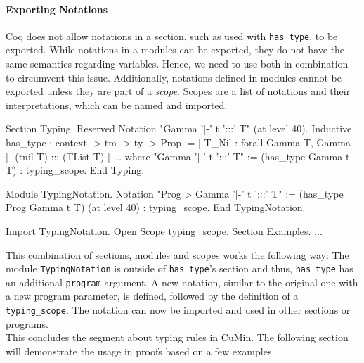 \documentclass[paper = a4, fleqn, abstract=on, twoside]{scrreprt}
\newcommand{\coqinline}[1]{\texttt{#1}}
\begin{document}
\paragraph{Exporting Notations}
Coq does not allow notations in a section, such as used with \coqinline{has_type}, to be exported. While notations in a modules can be exported, they do not have the same semantics regarding variables. Hence, we need to use both in combination to circumvent this issue. Additionally, notations defined in modules cannot be exported unless they are part of a \textit{scope}. Scopes are a list of notations and their interpretations, which can be named and imported.
\begin{coqcode}
Section Typing.
  Reserved Notation "Gamma '|-' t ':::' T" (at level 40).
  Inductive has_type : context -> tm -> ty -> Prop :=
    | T_Nil : forall Gamma T, Gamma |- (tnil T) ::: (TList T)
    | ...
  where "Gamma '|-' t ':::' T" := (has_type Gamma t T) : typing_scope.
End Typing.

Module TypingNotation.
  Notation "Prog > Gamma '|-' t ':::' T" := (has_type Prog Gamma t T)
    (at level 40) : typing_scope.
End TypingNotation.

Import TypingNotation. Open Scope typing_scope.
Section Examples. ...
\end{coqcode}
This combination of sections, modules and scopes works the following way: The module \texttt{TypingNotation} is outside of \coqinline{has_type}'s section and thus, \coqinline{has_type} has an additional \coqinline{program} argument. A new notation, similar to the original one with a new program parameter, is defined, followed by the definition of a \coqinline{typing_scope}.
The notation can now be imported and used in other sections or programs. \\
This concludes the segment about typing rules in CuMin. The following section will demonstrate the usage in proofs based on a few examples.
\end{document}
